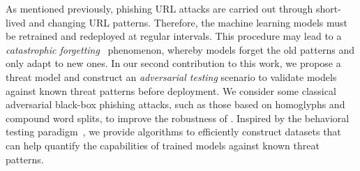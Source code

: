 As mentioned previously, phishing URL attacks are carried out through short-lived and changing URL patterns.
Therefore, the machine learning models must be retrained and redeployed at regular intervals.
This procedure may lead to a \textit{catastrophic forgetting}~\citep{mccloskey1989catastrophic} phenomenon, whereby models forget the old patterns and only adapt to new ones.
In our second contribution to this work, we propose a threat model and construct an \textit{adversarial testing} scenario to validate models against known threat patterns before deployment.
We consider some classical adversarial black-box phishing attacks, such as those based on homoglyphs and compound word splits, to improve the robustness of \URLTranSys.
Inspired by the behavioral testing paradigm~\citep{ribeiro2020beyond}, we provide algorithms to efficiently construct datasets that can help quantify the capabilities of trained models against known threat patterns.








\endinput
